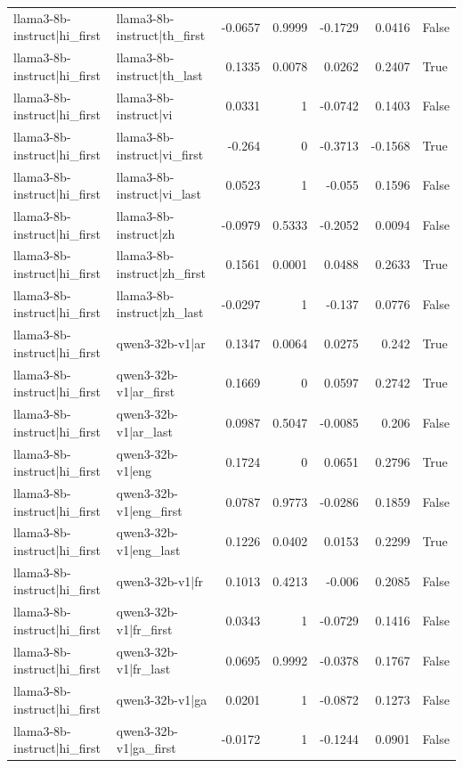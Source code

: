 \begin{table}
\begin{tabular}{l l r r r r l}
llama3-8b-instruct|hi_first & llama3-8b-instruct|th_first & -0.0657 & 0.9999 & -0.1729 & 0.0416 & False \\
llama3-8b-instruct|hi_first & llama3-8b-instruct|th_last & 0.1335 & 0.0078 & 0.0262 & 0.2407 & True \\
llama3-8b-instruct|hi_first & llama3-8b-instruct|vi & 0.0331 & 1 & -0.0742 & 0.1403 & False \\
llama3-8b-instruct|hi_first & llama3-8b-instruct|vi_first & -0.264 & 0 & -0.3713 & -0.1568 & True \\
llama3-8b-instruct|hi_first & llama3-8b-instruct|vi_last & 0.0523 & 1 & -0.055 & 0.1596 & False \\
llama3-8b-instruct|hi_first & llama3-8b-instruct|zh & -0.0979 & 0.5333 & -0.2052 & 0.0094 & False \\
llama3-8b-instruct|hi_first & llama3-8b-instruct|zh_first & 0.1561 & 0.0001 & 0.0488 & 0.2633 & True \\
llama3-8b-instruct|hi_first & llama3-8b-instruct|zh_last & -0.0297 & 1 & -0.137 & 0.0776 & False \\
llama3-8b-instruct|hi_first & qwen3-32b-v1|ar & 0.1347 & 0.0064 & 0.0275 & 0.242 & True \\
llama3-8b-instruct|hi_first & qwen3-32b-v1|ar_first & 0.1669 & 0 & 0.0597 & 0.2742 & True \\
llama3-8b-instruct|hi_first & qwen3-32b-v1|ar_last & 0.0987 & 0.5047 & -0.0085 & 0.206 & False \\
llama3-8b-instruct|hi_first & qwen3-32b-v1|eng & 0.1724 & 0 & 0.0651 & 0.2796 & True \\
llama3-8b-instruct|hi_first & qwen3-32b-v1|eng_first & 0.0787 & 0.9773 & -0.0286 & 0.1859 & False \\
llama3-8b-instruct|hi_first & qwen3-32b-v1|eng_last & 0.1226 & 0.0402 & 0.0153 & 0.2299 & True \\
llama3-8b-instruct|hi_first & qwen3-32b-v1|fr & 0.1013 & 0.4213 & -0.006 & 0.2085 & False \\
llama3-8b-instruct|hi_first & qwen3-32b-v1|fr_first & 0.0343 & 1 & -0.0729 & 0.1416 & False \\
llama3-8b-instruct|hi_first & qwen3-32b-v1|fr_last & 0.0695 & 0.9992 & -0.0378 & 0.1767 & False \\
llama3-8b-instruct|hi_first & qwen3-32b-v1|ga & 0.0201 & 1 & -0.0872 & 0.1273 & False \\
llama3-8b-instruct|hi_first & qwen3-32b-v1|ga_first & -0.0172 & 1 & -0.1244 & 0.0901 & False \\

\end{tabular}
\end{table}
